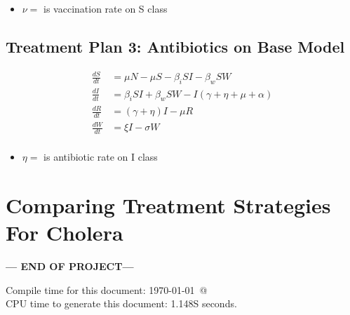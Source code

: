 \documentclass[12pt]{article}\usepackage[]{graphicx}\usepackage[]{color}
\begin{document}
\begin{itemize}
	\item $\nu=$ is vaccination rate on S class
\end{itemize}

\subsection{Treatment Plan 3: Antibiotics on Base Model}

\begin{linenomath}
\begin{align*}
	\frac{dS}{dt}&= \mu N - \mu S - \beta_i SI - \beta_w S W \\
	\frac{dI}{dt}&= \beta_i S I + \beta_w S W - I (\gamma +\eta + \mu + \alpha ) \\
	\frac{dR}{dt}&= (\gamma +\eta)I - \mu R \\
	\frac{dW}{dt}&= \xi I  - \sigma W\\
\end{align*}
\end{linenomath}
\begin{itemize}
	\item $\eta=$ is antibiotic rate on I class
\end{itemize}

\section{Comparing Treatment Strategies For Cholera}



\bigskip\vfill
\centerline{\bf--- END OF PROJECT---}
\bigskip
Compile time for this document:
\today\ @ \thistime\\
CPU time to generate this document: 1.148S seconds.
\printbibliography
\end{document}
